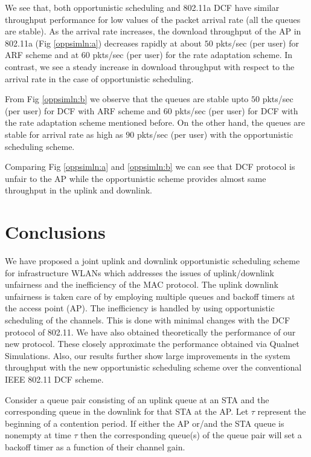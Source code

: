 \documentclass[10pt,conference]{IEEEtran}
\begin{document}
 We see that, both opportunistic scheduling and 802.11a DCF have similar throughput performance for low values of the packet arrival rate (all the queues are stable).
 As the arrival rate increases, the download throughput of the AP in 802.11a (Fig \ref{oppsimln:a}) decreases rapidly at about $50$ pkts/sec (per user) for ARF scheme and at $60$ pkts/sec (per user) for the rate adaptation scheme.
 In contrast, we see a steady increase in download throughput with respect to the arrival rate in the case of opportunistic scheduling.  

 From Fig \ref{oppsimln:b} we observe that the queues are stable upto $50$ pkts/sec (per user) for DCF with ARF scheme and $60$ pkts/sec (per user) for DCF with the rate adaptation scheme mentioned before.
 On the other hand, the queues are stable for arrival rate as high as $90$ pkts/sec (per user) with the opportunistic scheduling scheme.

 Comparing Fig \ref{oppsimln:a} and \ref{oppsimln:b} we can see that DCF protocol is unfair to the AP while the opportunistic scheme provides almost same throughput in the uplink and downlink.

\section{Conclusions}
\label{sec:conclusion}
 We have proposed a joint uplink and downlink opportunistic scheduling scheme for infrastructure WLANs which addresses the issues of uplink/downlink unfairness and the inefficiency of the MAC protocol. 
The uplink downlink unfairness is taken care of by employing multiple queues and backoff timers at the access point (AP).
The inefficiency is handled by using opportunistic scheduling of the channels.
This is done with minimal changes with the DCF protocol of 802.11.
We have also obtained theoretically the performance of our new protocol.
These closely approximate the performance obtained via Qualnet Simulations.
Also, our results further show large improvements in the system throughput with the new opportunistic scheduling scheme over the conventional IEEE 802.11 DCF scheme.

\appendix
\label{app_oppsched1}
Consider a  queue pair consisting of an uplink queue at an STA and the corresponding queue in the downlink for that STA at the AP.
Let $\tau$ represent the beginning of a contention period. 
If either the AP or/and the STA queue is nonempty  at time $\tau$ then the corresponding queue(s) of the queue pair will set a backoff timer as a function of their channel gain.
 
\end{document}
